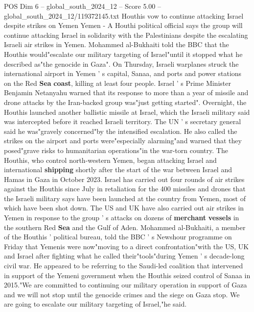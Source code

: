 \begin{textsample}{POS Dim 6 – global\_south\_2024\_12 – Score 5.00 – global\_south\_2024\_12/119372145.txt}  \label{ex:f6_pos_322}
Houthis vow to continue attacking Israel despite strikes on Yemen Yemen - A Houthi political official says the group will continue attacking Israel in solidarity with the Palestinians despite the escalating Israeli air strikes in Yemen.
Mohammed al-Bukhaiti told the BBC that the Houthis would"escalate our military targeting of Israel"until it stopped what he described as"the genocide in Gaza".
On Thursday, Israeli warplanes struck the international airport in Yemen ' s capital, Sanaa, and ports and power stations on the Red \textbf{Sea} \textbf{coast}, killing at least four people.
Israel ' s Prime Minister Benjamin Netanyahu warned that its response to more than a year of missile and drone attacks by the Iran-backed group was"just getting started".
Overnight, the Houthis launched another ballistic missile at Israel, which the Israeli military said was intercepted before it reached Israeli territory.
The UN ' s secretary general said he was"gravely concerned"by the intensified escalation.
He also called the strikes on the airport and ports were"especially alarming"and warned that they posed"grave risks to humanitarian operations"in the war-torn country.
The Houthis, who control north-western Yemen, began attacking Israel and international \textbf{shipping} shortly after the start of the war between Israel and Hamas in Gaza in October 2023.
Israel has carried out four rounds of air strikes against the Houthis since July in retaliation for the 400 missiles and drones that the Israeli military says have been launched at the country from Yemen, most of which have been shot down.
The US and UK have also carried out air strikes in Yemen in response to the group ' s attacks on dozens of \textbf{merchant} \textbf{vessels} in the southern Red \textbf{Sea} and the Gulf of Aden.
Mohammed al-Bukhaiti, a member of the Houthis ' political bureau, told the BBC ' s Newshour programme on Friday that Yemenis were now"moving to a direct confrontation"with the US, UK and Israel after fighting what he called their"tools"during Yemen ' s decade-long civil war.
He appeared to be referring to the Saudi-led coalition that intervened in support of the Yemeni government when the Houthis seized control of Sanaa in 2015."We are committed to continuing our military operation in support of Gaza and we will not stop until the genocide crimes and the siege on Gaza stop.
We are going to escalate our military targeting of Israel,"he said.

\end{textsample}
